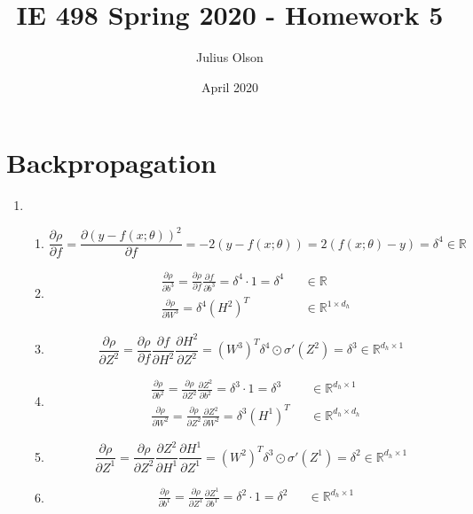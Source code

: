 \documentclass{article}
\title{IE 498 Spring 2020  -  Homework 5}
\author{Julius Olson}
\date{April 2020}
\begin{document}
\maketitle

\thispagestyle{fancy}

\section{Backpropagation}
\begin{enumerate}[label=(\alph*)]
	\item \begin{enumerate}[label=(\roman*)]
		\item $$\frac{\partial \rho}{\partial f} = \frac{\partial (y - f(x; \theta))^2}{\partial f} = -2(y - f(x; \theta)) = 2 (f(x; \theta) - y) = \delta^4 \in \mathbb{R}$$
	\item \begin{align*}&\frac{\partial \rho}{\partial b^3} = \frac{\partial \rho}{\partial f}\frac{\partial f}{\partial b^3} = \delta^4 \cdot 1 = \delta^4 &&\in \mathbb{R} \\ & \frac{\partial \rho}{\partial W^3} = \delta^4\left(H^2\right)^T &&\in \mathbb{R}^{1 \times d_h}\end{align*}
		\item $$\frac{\partial \rho}{\partial Z^2} = \frac{\partial \rho}{\partial f}\frac{\partial f}{\partial H^2}\frac{\partial H^2}{\partial Z^2} = \left(W^3\right)^T\delta^4 \odot \sigma'(Z^2) = \delta^3 \in \mathbb{R}^{d_h \times 1}$$
		\item \begin{align*}
			&\frac{\partial \rho}{\partial b^2} = \frac{\partial \rho}{\partial Z^2}\frac{\partial Z^2}{\partial b^2} = \delta^3 \cdot 1 = \delta^3 && \in \mathbb{R}^{d_h \times 1} \\
			&\frac{\partial \rho}{\partial W^2} = \frac{\partial \rho}{\partial Z^2}\frac{\partial Z^2}{\partial W^2} = \delta^3 \left(H^1\right)^T && \in \mathbb{R}^{d_h \times d_h}
		\end{align*}
		\item $$\frac{\partial \rho}{\partial Z^1} = \frac{\partial \rho}{\partial Z^2}\frac{\partial Z^2}{\partial H^1}\frac{\partial H^1}{\partial Z^1} = \left(W^2\right)^T\delta^3 \odot \sigma'(Z^1) = \delta^2 \in \mathbb{R}^{d_h \times 1}$$
		\item \begin{align*}
			&\frac{\partial \rho}{\partial b^1} = \frac{\partial \rho}{\partial Z^1}\frac{\partial Z^1}{\partial b^1} = \delta^2 \cdot 1 = \delta^2 && \in \mathbb{R}^{d_h \times 1} \\

\end{align*}
\end{enumerate}
\end{enumerate}
\end{document}
